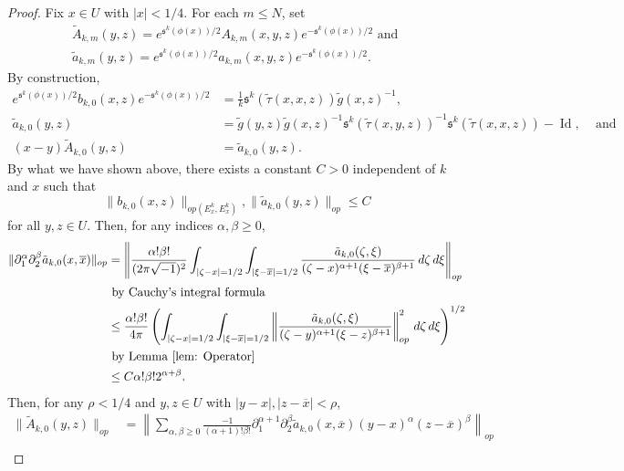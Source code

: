 \documentclass{amsart}
\theoremstyle{definition}
\theoremstyle{remark}
\numberwithin{equation}{section}
\DeclareMathOperator{\Id}{Id}
\begin{document}
\begin{proof}
Fix $x \in U$ with $|x| < 1/4$. For each $m \leq N$, set
\begin{gather*}
\tilde{A}_{k,m}(y,z) =   e^{\mathfrak{s}^k(\phi(x))/2} A_{k,m}(x,y,z) e^{-\mathfrak{s}^k(\phi(x))/2} \text{ and } \\  
\tilde{a}_{k,m}(y,z) = e^{\mathfrak{s}^k(\phi(x))/2} a_{k,m}(x,y,z) e^{-\mathfrak{s}^k(\phi(x))/2}.
\end{gather*}
By construction,
\begin{align*}
e^{\mathfrak{s}^k(\phi(x))/2} b_{k,0}(x,z) e^{-\mathfrak{s}^k(\phi(x))/2} & =  \frac{1}{k} \mathfrak{s}^k(\tilde{\tau}(x,x,z)) \tilde{g}(x,z)^{-1}, \\
\tilde{a}_{k,0}(y,z) & = \tilde{g}(y,z)\tilde{g}(x,z)^{-1} \mathfrak{s}^k(\tilde{\tau}(x,y,z))^{-1} \mathfrak{s}^k(\tilde{\tau}(x,x,z)) - \Id, \hspace{10pt} \text{ and } \\
(x-y)\tilde{A}_{k,0}(y,z) & = \tilde{a}_{k,0}(y,z).
\end{align*}
By what we have shown above, there exists a constant $C > 0$ independent of $k$ and $x$ such that 
$$
\| b_{k,0}(x,z) \|_{op(E^k_x,E^k_x)}, \|\tilde{a}_{k,0}(y,z)\|_{op} \leq C
$$
for all $y,z \in U$. Then, for any indices $\alpha,\beta \geq 0$,
\begin{align*}
\|\partial_1^\alpha \partial_2^\beta \tilde{a}_{k,0}(x,\overline{x})\|_{op} & = \left \|\frac{\alpha!\beta!}{(2\pi \sqrt{-1})^2} \int_{|\zeta-x|=1/2} \int_{|\xi-\overline{x}|=1/2} \frac{\tilde{a}_{k,0}(\zeta,\xi)}{(\zeta -x)^{\alpha + 1} (\xi-\overline{x})^{\beta+1}} \,d\zeta\,d\xi \right \|_{op} \\
    & \text{ by Cauchy's integral formula} \\
    & \leq \frac{\alpha! \beta!}{4\pi}  \left ( \int_{|\zeta-x|=1/2} \int_{|\xi-\overline{x}|=1/2} \left \| \frac{\tilde{a}_{k,0}(\zeta,\xi)}{(\zeta -y)^{\alpha + 1} (\xi-z)^{\beta+1}}\right \|_{op}^2  \,d\zeta\,d\xi \right)^{1/2} \\
    & \text{ by Lemma \ref{lem: Operator}} \\
    & \leq C \alpha!\beta! 2^{\alpha+\beta}.
\end{align*}
Then, for any $\rho < 1/4$ and $y,z \in U$ with $|y-x|,|z-\overline{x}| < \rho$,
\begin{align*}
\|\tilde{A}_{k,0}(y,z)\|_{op} & = \left \|\sum_{\alpha,\beta \geq 0} \frac{-1}{(\alpha+1)!\beta!}\partial_1^{\alpha+1} \partial_2^\beta \tilde{a}_{k,0}(x,\overline{x}) (y-x)^\alpha (z-\overline{x})^\beta \right \|_{op} \\

\end{align*}
\end{proof}
\end{document}
